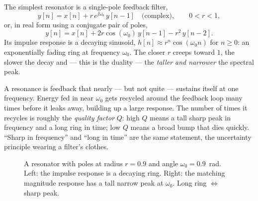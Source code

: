 The simplest resonator is a single-pole feedback filter,
\begin{equation}
  y[n] = x[n] + r\,e^{\jj\omega_0}\, y[n-1] \quad\text{(complex)},
  \qquad 0 < r < 1,
  \label{ch14:reson}
\end{equation}
or, in real form using a conjugate pair of poles,
\[
  y[n] = x[n] + 2r\cos(\omega_0)\,y[n-1] - r^2\,y[n-2].
\]
Its impulse response is a decaying sinusoid, $h[n] \approx r^n\cos(\omega_0 n)$
for $n\ge0$: an exponentially fading ring at frequency $\omega_0$. The closer
$r$ creeps toward $1$, the slower the decay and --- this is the duality --- the
\emph{taller and narrower} the spectral peak.

\begin{intuitionbox}
A resonance is feedback that nearly --- but not quite --- sustains itself at one
frequency. Energy fed in near $\omega_0$ gets recycled around the feedback loop
many times before it leaks away, building up a large response. The number of
times it recycles is roughly the \emph{quality factor} $Q$: high $Q$ means a
tall sharp peak in frequency and a long ring in time; low $Q$ means a broad
bump that dies quickly. ``Sharp in frequency'' and ``long in time'' are the same
statement, the uncertainty principle wearing a filter's clothes.
\end{intuitionbox}

\begin{figure}[H]
\centering
{}
\caption{A resonator with poles at radius $r=0.9$ and angle $\omega_0=0.9$~rad.
Left: the impulse response is a decaying ring. Right: the matching magnitude
response has a tall narrow peak at $\omega_0$. Long ring $\Leftrightarrow$
sharp peak.}
\label{ch14:fig-reson}
\end{figure}

